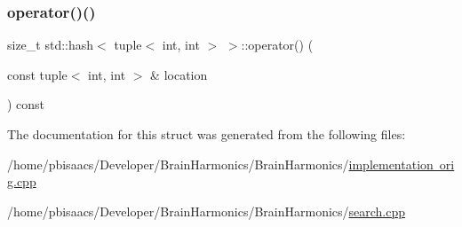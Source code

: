 \mbox{\label{structstd_1_1hash_3_01tuple_3_01int_00_01int_01_4_01_4_af46854ec2c5aa6cd6d1cd164374bd54f}} 
\subsubsection{\texorpdfstring{operator()()}{operator()()}\hspace{0.1cm}{\footnotesize\ttfamily [2/2]}}
{\footnotesize\ttfamily size\+\_\+t std\+::hash$<$ tuple$<$ int, int $>$ $>$\+::operator() (\begin{DoxyParamCaption}\item[{const tuple$<$ int, int $>$ \&}]{location }\end{DoxyParamCaption}) const\hspace{0.3cm}{\ttfamily [inline]}}



The documentation for this struct was generated from the following files\+:\begin{DoxyCompactItemize}
\item 
/home/pbisaacs/\+Developer/\+Brain\+Harmonics/\+Brain\+Harmonics/\mbox{\hyperlink{implementation_01orig_8cpp}{implementation orig.\+cpp}}\item 
/home/pbisaacs/\+Developer/\+Brain\+Harmonics/\+Brain\+Harmonics/\mbox{\hyperlink{search_8cpp}{search.\+cpp}}\end{DoxyCompactItemize}
